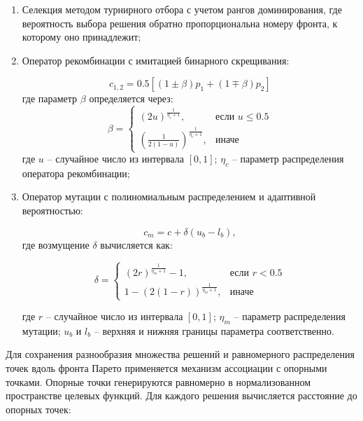 \begin{enumerate}
\item Селекция методом турнирного отбора с учетом рангов доминирования, где вероятность выбора решения обратно пропорциональна номеру фронта, к которому оно принадлежит;

\item Оператор рекомбинации с имитацией бинарного скрещивания:

\begin{equation*}
c_{1,2} = 0.5[(1 \pm \beta)p_1 + (1 \mp \beta)p_2]
\end{equation*}
где параметр $\beta$ определяется через:
\begin{equation*}
\beta = \begin{cases}
(2u)^{\frac{1}{\eta_c + 1}}, & \text{если } u \leq 0.5 \\
(\frac{1}{2(1-u)})^{\frac{1}{\eta_c + 1}}, & \text{иначе}
\end{cases}
\end{equation*}
где $u$ -- случайное число из интервала $[0,1]$;
$\eta_c$ -- параметр распределения оператора рекомбинации;

\item Оператор мутации с полиномиальным распределением и адаптивной вероятностью:

\begin{equation*}
c_m = c + \delta(u_b - l_b),
\end{equation*}
где возмущение $\delta$ вычисляется как:

\begin{equation*}
\delta = \begin{cases}
(2r)^{\frac{1}{\eta_m + 1}} - 1, & \text{если } r < 0.5 \\
1 - (2(1-r))^{\frac{1}{\eta_m + 1}}, & \text{иначе}
\end{cases}
\end{equation*}

где $r$ -- случайное число из интервала $[0,1]$;
$\eta_m$ -- параметр распределения мутации;
$u_b$ и $l_b$ -- верхняя и нижняя границы параметра соответственно.
\end{enumerate}

Для сохранения разнообразия множества решений и равномерного распределения точек вдоль фронта Парето
применяется механизм ассоциации с опорными точками. Опорные
точки генерируются равномерно в нормализованном
пространстве целевых функций. Для каждого решения вычисляется расстояние до опорных точек:

